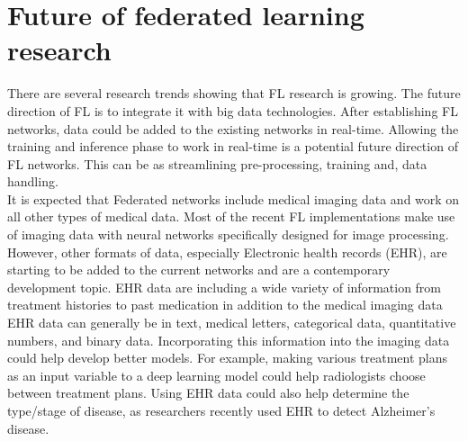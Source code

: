 \section{Future of federated learning research}

There are several research trends showing that FL research is growing. The future direction of FL is to integrate it with big data technologies. After establishing FL networks, data could be added to the existing networks in real-time. Allowing the training and inference phase to work in real-time is a potential future direction of FL networks. This can be as streamlining pre-processing, training and, data handling.
\\

It is expected that Federated networks include medical imaging data and work on all other types of medical data. Most of the recent FL implementations make use of imaging data with neural networks specifically designed for image processing. However, other formats of data, especially Electronic health records (EHR), are starting to be added to the current networks and are a contemporary development topic. EHR data are including a wide variety of information from treatment histories to past medication in addition to the medical imaging data EHR data can generally be in text, medical letters, categorical data, quantitative numbers, and binary data\cite{seymour2012electronic}. Incorporating this information into the imaging data could help develop better models. For example, making various treatment plans as an input variable to a deep learning model could help radiologists choose between treatment plans. Using EHR data could also help determine the type/stage of disease, as researchers recently used EHR to detect Alzheimer's disease\cite{venugopalan2021multimodal}.
\\

